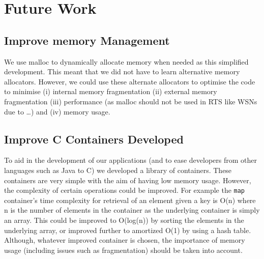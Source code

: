 \section{Future Work}

\subsection{Improve memory Management}

We use malloc to dynamically allocate memory when needed as this simplified development. This meant that we did not have to learn alternative memory allocators. However, we could use these alternate allocators to optimise the code to minimise (i) internal memory fragmentation (ii) external memory fragmentation (iii) performance (as malloc should not be used in RTS like WSNs due to \ldots) and (iv) memory usage.


\subsection{Improve C Containers Developed}

To aid in the development of our applications (and to ease developers from other languages such as Java to C) we developed a library of containers. These containers are very simple with the aim of having low memory usage. However, the complexity of certain operations could be improved. For example the \verb|map| container's time complexity for retrieval of an element given a key is O(n) where n is the number of elements in the container as the underlying container is simply an array. This could be improved to O(log(n)) by sorting the elements in the underlying array, or improved further to amortized O(1) by using a hash table. Although, whatever improved container is chosen, the importance of memory usage (including issues such as fragmentation) should be taken into account.
